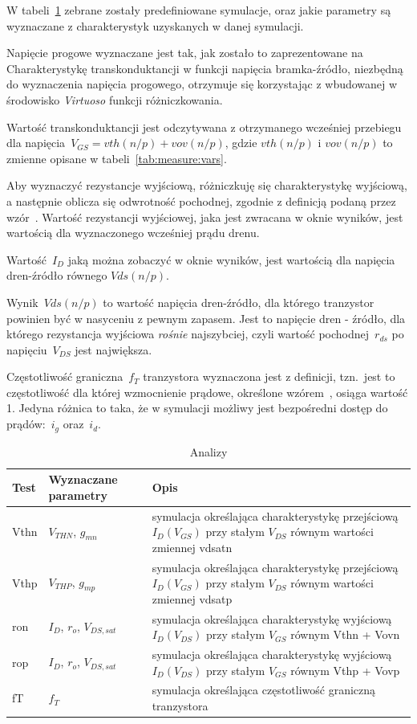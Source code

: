 \documentclass[twoside,pl,final]{labman}
\begin{document}
W tabeli~\ref{tab:measure:sims} zebrane zostały predefiniowane symulacje,
oraz jakie parametry są wyznaczane z charakterystyk uzyskanych w danej symulacji.

Napięcie progowe wyznaczane jest tak,
jak zostało to zaprezentowane na~
Charakterystykę transkonduktancji w funkcji napięcia bramka-źródło,
niezbędną do wyznaczenia napięcia progowego,
otrzymuje się korzystając z wbudowanej w środowisko
\emph{Virtuoso} funkcji różniczkowania.

Wartość transkonduktancji jest odczytywana z otrzymanego wcześniej przebiegu
dla napięcia~$V_{GS} = vth(n/p) + vov(n/p)$,
gdzie $vth(n/p)$ i $vov(n/p)$ to zmienne opisane w tabeli~\ref{tab:measure:vars}.

Aby wyznaczyć rezystancje wyjściową, różniczkuję się charakterystykę wyjściową,
a następnie oblicza się odwrotność pochodnej,
zgodnie z definicją podaną przez wzór~.
Wartość rezystancji wyjściowej, jaka jest zwracana w oknie wyników,
jest wartością dla wyznaczonego wcześniej prądu drenu.

Wartość~$I_D$ jaką można zobaczyć w oknie wyników,
jest wartością dla napięcia dren-źródło równego $Vds(n/p)$.

Wynik~$Vds(n/p)$ to wartość napięcia dren-źródło,
dla którego tranzystor powinien być w nasyceniu z pewnym zapasem.
Jest to napięcie dren - źródło, dla którego rezystancja wyjściowa
\emph{rośnie} najszybciej,
czyli wartość pochodnej~$r_{ds}$ po napięciu~$V_{DS}$ jest największa.

Częstotliwość graniczna~$f_T$ tranzystora wyznaczona jest z definicji,
tzn.~jest to częstotliwość dla której wzmocnienie prądowe,
określone wzórem~, osiąga wartość 1.
Jedyna różnica to taka, że w symulacji możliwy jest bezpośredni dostęp do
prądów:~$i_g$ oraz~$i_d$.

\begin{table}[htbp]
  \centering
  \caption{Analizy}
  \label{tab:measure:sims}
  \begin{tabular}{l l p{}}
    \hline \hline
    Test & Wyznaczane parametry & Opis \\
    \hline
    Vthn & $V_{THN}$, $g_{mn}$ & symulacja określająca charakterystykę przejściową $I_D(V_{GS})$ przy stałym $V_{DS}$ równym wartości zmiennej vdsatn \\
    Vthp & $V_{THP}$, $g_{mp}$ & symulacja określająca charakterystykę przejściową $I_D(V_{GS})$ przy stałym $V_{DS}$ równym wartości zmiennej vdsatp \\
    ron  & $I_D$, $r_o$, $V_{DS,sat}$ & symulacja określająca charakterystykę wyjściową $I_D(V_{DS})$ przy stałym $V_{GS}$ równym Vthn + Vovn \\
    rop  & $I_D$, $r_o$, $V_{DS,sat}$ & symulacja określająca charakterystykę wyjściową $I_D(V_{DS})$ przy stałym $V_{GS}$ równym Vthp + Vovp \\
    fT   & $f_T$ & symulacja określająca częstotliwość graniczną tranzystora \\
    \hline \hline
  \end{tabular}
\end{table}
\end{document}
